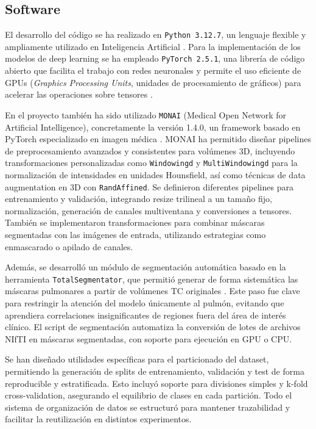 \subsection{Software}
El desarrollo del código se ha realizado en \texttt{Python 3.12.7}, un lenguaje flexible y ampliamente utilizado en Inteligencia Artificial \parencite{python}. Para la implementación de los modelos de deep learning se ha empleado \texttt{PyTorch 2.5.1}, una librería de código abierto que facilita el trabajo con redes neuronales y permite el uso eficiente de GPUs  (\emph{Graphics Processing Units}, unidades de procesamiento de gráficos) para acelerar las operaciones sobre tensores \parencite{paszke2019pytorch}.

En el proyecto también ha sido utilizado \texttt{MONAI} (Medical Open Network for Artificial Intelligence), concretamente la versión 1.4.0, un framework basado en PyTorch especializado en imagen médica \parencite{cardoso2022monai}. MONAI ha permitido diseñar pipelines de preprocesamiento avanzados y consistentes para volúmenes 3D, incluyendo transformaciones personalizadas como \texttt{Windowingd} y \texttt{MultiWindowingd} para la normalización de intensidades en unidades Hounsfield, así como técnicas de data augmentation en 3D con \texttt{RandAffined}. Se definieron diferentes pipelines para entrenamiento y validación, integrando resize trilineal a un tamaño fijo, normalización, generación de canales multiventana y conversiones a tensores. También se implementaron transformaciones para combinar máscaras segmentadas con las imágenes de entrada, utilizando estrategias como enmascarado o apilado de canales.

Además, se desarrolló un módulo de segmentación automática basado en la herramienta \texttt{TotalSegmentator}, que permitió generar de forma sistemática las máscaras pulmonares a partir de volúmenes TC originales \parencite{wasserthal2023totalsegmentator}. Este paso fue clave para restringir la atención del modelo únicamente al pulmón, evitando que aprendiera correlaciones insignificantes de regiones fuera del área de interés clínico. El script de segmentación automatiza la conversión de lotes de archivos NIfTI en máscaras segmentadas, con soporte para ejecución en GPU o CPU.

Se han diseñado utilidades específicas para el particionado del dataset, permitiendo la generación de splits de entrenamiento, validación y test de forma reproducible y estratificada. Esto incluyó soporte para divisiones simples y k-fold cross-validation, asegurando el equilibrio de clases en cada partición. Todo el sistema de organización de datos se estructuró para mantener trazabilidad y facilitar la reutilización en distintos experimentos.

